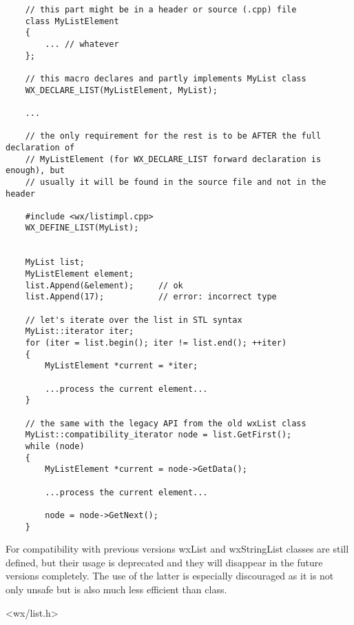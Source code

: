 \begin{verbatim}
    // this part might be in a header or source (.cpp) file
    class MyListElement
    {
        ... // whatever
    };

    // this macro declares and partly implements MyList class
    WX_DECLARE_LIST(MyListElement, MyList);

    ...

    // the only requirement for the rest is to be AFTER the full declaration of
    // MyListElement (for WX_DECLARE_LIST forward declaration is enough), but
    // usually it will be found in the source file and not in the header

    #include <wx/listimpl.cpp>
    WX_DEFINE_LIST(MyList);


    MyList list;
    MyListElement element;
    list.Append(&element);     // ok
    list.Append(17);           // error: incorrect type

    // let's iterate over the list in STL syntax
    MyList::iterator iter;
    for (iter = list.begin(); iter != list.end(); ++iter)
    {
        MyListElement *current = *iter;

        ...process the current element...
    }

    // the same with the legacy API from the old wxList class
    MyList::compatibility_iterator node = list.GetFirst();
    while (node)
    {
        MyListElement *current = node->GetData();

        ...process the current element...
        
        node = node->GetNext();
    }

\end{verbatim}

For compatibility with previous versions wxList and wxStringList classes are
still defined, but their usage is deprecated and they will disappear in the
future versions completely. The use of the latter is especially discouraged as
it is not only unsafe but is also much less efficient than
 class.


<wx/list.h>




\label{wxlistctor}


